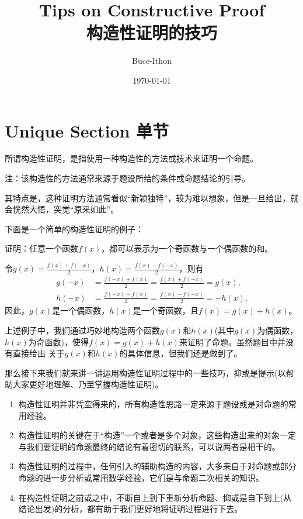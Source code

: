 \documentclass{Math_Note}
\title{Tips on Constructive Proof \\ 构造性证明的技巧}
\author{Buce-Ithon}
\date{\today}
\begin{document}
\maketitle

\newpage
\tableofcontents
\newpage

\section{Unique Section 单节}

所谓构造性证明，是指使用一种构造性的方法或技术来证明一个命题。

注：该构造性的方法通常来源于题设所给的条件或命题结论的引导。

其特点是，这种证明方法通常看似“新颖独特”，较为难以想象，但是一旦给出，就会恍然大悟，突觉“原来如此”。

下面是一个简单的构造性证明的例子：
\begin{prb}
    证明：任意一个函数$f(x)$，都可以表示为一个奇函数与一个偶函数的和。
\end{prb}
\begin{pf}
    令$g(x)=\frac{f(x)+f(-x)}{2}$，$h(x)=\frac{f(x)-f(-x)}{2}$，则有
    \begin{align*}
        g(-x)&=\frac{f(-x)+f(x)}{2}=\frac{f(x)+f(-x)}{2}=g(x),\\
        h(-x)&=\frac{f(-x)-f(x)}{2}=\frac{f(x)-f(-x)}{2}=-h(x).
    \end{align*}
    因此，$g(x)$是一个偶函数，$h(x)$是一个奇函数，且$f(x)=g(x)+h(x)$。
\end{pf}

上述例子中，我们通过巧妙地构造两个函数$g(x)$和$h(x)$(其中$g(x)$为偶函数，$h(x)$为奇函数)，使得$f(x)=g(x)+h(x)$来证明了命题。虽然题目中并没有直接给出
关于$g(x)$和$h(x)$的具体信息，但我们还是做到了。

那么接下来我们就来讲一讲运用构造性证明过程中的一些技巧，抑或是提示(以帮助大家更好地理解、乃至掌握构造性证明)。

\begin{enumerate}
    \item 构造性证明并非凭空得来的，所有构造性思路一定来源于题设或是对命题的常用经验。
    \item 构造性证明的关键在于“构造”一个或者是多个对象，这些构造出来的对象一定与我们要证明的命题最终的结论有着密切的联系，可以说两者是相干的。
    \item 构造性证明的过程中，任何引入的辅助构造的内容，大多来自于对命题或部分命题的进一步分析或常用数学经验，它们是与命题二次相关的知识。
    \item 在构造性证明之前或之中，不断自上到下重新分析命题、抑或是自下到上(从结论出发)的分析，都有助于我们更好地将证明过程进行下去。
\end{enumerate}
\end{document}

